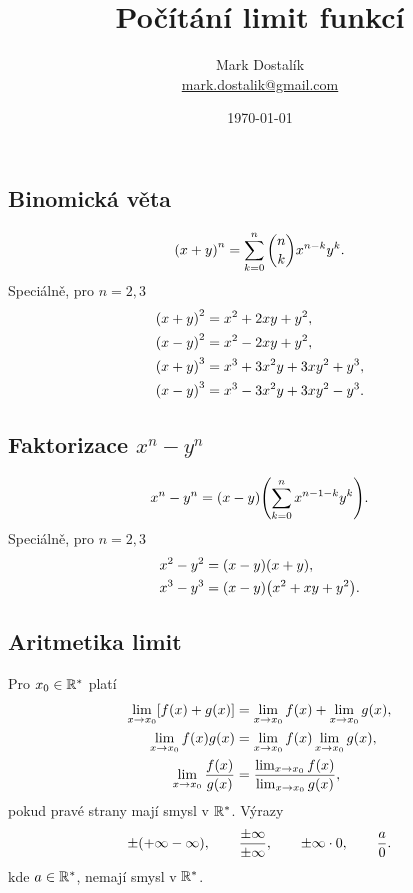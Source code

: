 \documentclass[columns=2]{cheatsheet}
\title{Počítání limit funkcí}
\author{Mark Dostal\'{i}k \\ \href{mailto:mark.dostalik@gmail.com}{mark.dostalik@gmail.com}}
\date{\today}
\begin{document}
\maketitle
\subsection{Binomická věta}
\begin{equation*}
  \parens{x + y}^n = \sum_{k=0}^{n} \binom{n}{k} x^{n - k} y^k.
\end{equation*}
Speciálně, pro $n = 2, 3$
\begin{align*}
  \parens{x + y}^2 
  &= 
  x^2 + 2xy + y^2,
  \\
  \parens{x - y}^2 
  &= 
  x^2 - 2xy + y^2,
  \\  
  \parens{x + y}^3 
  &= 
  x^3 + 3 x^2 y + 3 x y^2 + y^3,
  \\
  \parens{x - y}^3 
  &= 
  x^3 - 3 x^2 y + 3 x y^2 - y^3.
\end{align*}

\subsection{Faktorizace $x^n - y^n$}
\begin{equation*}
  x^n - y^n = \parens{x - y} \parens{\sum_{k=0}^{n} x^{n -1 -k} y^k}.
\end{equation*}
Speciálně, pro $n = 2, 3$
\begin{align*}
  x^2 - y^2 
  &= 
  \parens{x - y} \parens{x + y},
  \\
  x^3 - y^3 
  &= 
  \parens{x - y} \parens{x^2 + xy + y^2}.
\end{align*}

\vfill\null\columnbreak

\subsection{Aritmetika limit}
Pro $x_0 \in \mathbb{R}^*$ platí
\begin{align*}
  \lim_{x \to x_0} \brackets{f(x) + g(x)}
  &=
  \lim_{x \to x_0} f(x) + \lim_{x \to x_0} g(x),
  \\
  \lim_{x \to x_0} f(x) g(x)
  &=
  \lim_{x \to x_0} f(x) \lim_{x \to x_0} g(x),
  \\
  \lim_{x \to x_0} \frac{f(x)}{g(x)}
  &=
  \frac{\lim_{x \to x_0} f(x)}{\lim_{x \to x_0} g(x)},
\end{align*}
pokud pravé strany mají smysl v $\mathbb{R}^*$. Výrazy
\begin{equation*}
  \pm \parens{+ \infty - \infty}, 
  \qquad 
  \frac{\pm \infty}{\pm \infty},
  \qquad
  \pm \infty \cdot 0,
  \qquad
  \frac{a}{0}.
\end{equation*}
kde $a \in \mathbb{R}^*$, nemají smysl v $\mathbb{R}^*$.
\end{document}
